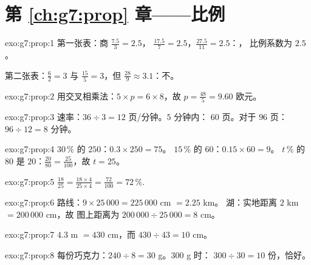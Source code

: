 \section*{第 \ref{ch:g7:prop} 章——比例}

\begin{solution}{exo:g7:prop:1}
第一张表：商 $\frac{7.5}{3} = 2.5$，
$\frac{17.5}{7} = 2.5$，$\frac{27.5}{11} = 2.5$：，
比例系数为 $2.5$。

第二张表：$\frac62 = 3$ 与 $\frac{15}{5} = 3$，但
$\frac{28}{9} \approx 3.1$：不。
\end{solution}

\begin{solution}{exo:g7:prop:2}
用交叉相乘法：$5 \times p = 6 \times 8$，故
$p = \frac{48}{5} = 9.60$ 欧元。
\end{solution}

\begin{solution}{exo:g7:prop:3}
速率：$36 \div 3 = 12$ 页/分钟。$5$ 分钟内：
$60$ 页。对于 $96$ 页：$96 \div 12 = 8$ 分钟。
\end{solution}

\begin{solution}{exo:g7:prop:4}
$30\,\%$ 的 $250$：$0.3 \times 250 = 75$。\quad
$15\,\%$ 的 $60$：$0.15 \times 60 = 9$。\quad
$t\,\%$ 的 $80$ 是 $20$：$\frac{20}{80} = \frac{25}{100}$，故
$t = 25$。
\end{solution}

\begin{solution}{exo:g7:prop:5}
$\frac{18}{25} = \frac{18 \times 4}{25 \times 4} = \frac{72}{100} =
72\,\%$.
\end{solution}

\begin{solution}{exo:g7:prop:6}
路线：$9 \times 25\,000 = 225\,000$ cm $= 2.25$ km。
湖：实地距离 $2$ km $= 200\,000$ cm，故
图上距离为 $200\,000 \div 25\,000 = 8$ cm。
\end{solution}

\begin{solution}{exo:g7:prop:7}
$4.3$ m $= 430$ cm，而 $430 \div 43 = 10$ cm。
\end{solution}

\begin{solution}{exo:g7:prop:8}
每份巧克力：$240 \div 8 = 30$ g。$300$ g 时：
$300 \div 30 = 10$ 份，恰好。
\end{solution}

